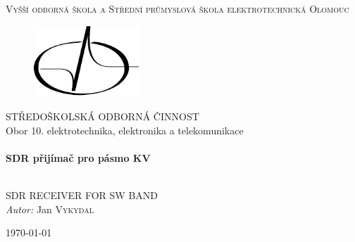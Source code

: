 \begin{titlepage}
  \begin{center}


  \textsc{\LARGE Vyšší odborná škola a Střední průmyslová škola elektrotechnická Olomouc}%

	\begin{figure}[H]
    \centering
    \includegraphics[width=4cm]{img/logo/logo.pdf}
  \end{figure}

  \textsc{\Large STŘEDOŠKOLSKÁ ODBORNÁ ČINNOST}\\[0.5cm]
  Obor 10. elektrotechnika, elektronika a telekomunikace\\[.2cm]
	
	
	
  \HRule \\[0.4cm]
  { \huge \bfseries SDR přijímač pro pásmo KV\\[0.4cm] }

  \HRule \\[.5cm]
  
  SDR RECEIVER FOR SW BAND\\[1.5cm]
		
  \emph{Autor:} Jan \textsc{Vykydal}
  
  \vfill

  {\large \today}

  \end{center}
\end{titlepage}
